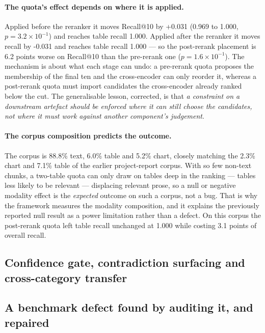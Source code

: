 \documentclass[preprint,3p,times]{elsarticle}
\begin{document}
\paragraph{The quota's effect depends on where it is applied.} Applied before the reranker it moves Recall@10 by +0.031 (0.969 to 1.000, $p=3.2\!\times\!10^{-1}$) and reaches table recall 1.000. Applied after the reranker it moves recall by -0.031 and reaches table recall 1.000 --- so the post-rerank placement is 6.2 points worse on Recall@10 than the pre-rerank one ($p=1.6\!\times\!10^{-1}$). The mechanism is about what each stage can undo: a pre-rerank quota proposes the membership of the final ten and the cross-encoder can only reorder it, whereas a post-rerank quota must import candidates the cross-encoder already ranked below the cut.
The generalisable lesson, corrected, is that \emph{a constraint on a
downstream artefact should be enforced where it can still choose the
candidates, not where it must work against another component's judgement}.


\paragraph{The corpus composition predicts the outcome.} The corpus is
88.8\% text, 6.0\% table and
5.2\% chart, closely matching the 2.3\% chart and 7.1\%
table of the earlier project-report corpus. With so few non-text chunks, a
two-table quota can only draw on tables deep in the ranking --- tables less
likely to be relevant --- displacing relevant prose, so a null or negative
modality effect is the \emph{expected} outcome on such a corpus, not a bug.
That is why the framework measures the modality composition, and it explains
the previously reported null result as a power limitation rather than a
defect. On this corpus the post-rerank quota left table recall unchanged at 1.000 while costing
3.1 points of overall recall.

\subsection{Confidence gate, contradiction surfacing and cross-category transfer}

\subsection{A benchmark defect found by auditing it, and repaired}
\end{document}
